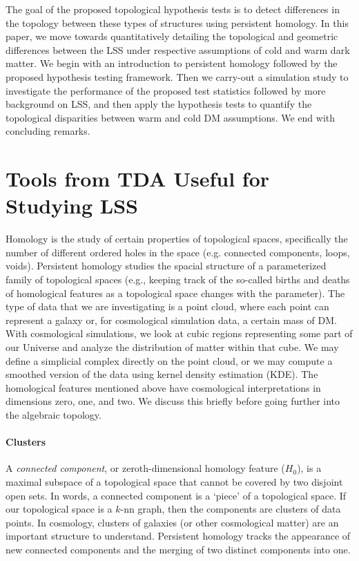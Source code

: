 \documentclass[12pt]{article}
\begin{document}
The goal of the proposed topological hypothesis tests is to detect differences in the topology between these types of structures using persistent homology. In this paper, we move towards quantitatively detailing the topological and geometric differences between the LSS under respective assumptions of cold and warm dark matter. We begin with an introduction to persistent homology followed by the proposed hypothesis testing framework. Then we carry-out a simulation study to investigate the performance of the proposed test statistics followed by more background on LSS, and then apply the hypothesis tests to quantify the topological disparities between warm and cold DM assumptions. We end with concluding remarks.



\section{Tools from TDA Useful for Studying LSS}
\label{sec:tda}
Homology is the study of certain properties of topological spaces, specifically the number of different ordered holes in the space (e.g. connected components, loops, voids). Persistent homology studies the spacial structure of a parameterized family of topological spaces (e.g., keeping track of the so-called
births and deaths of homological features as a topological space changes with the parameter).
%
The type of data that we are investigating is a point cloud, where each point can represent a galaxy or, for cosmological simulation data, a certain mass of DM.
With cosmological simulations,  we look at cubic regions representing some part of our Universe and analyze
the distribution of matter within that cube. We may define a simplicial complex directly on the point cloud, or we may compute a smoothed version of the data using kernel density estimation (KDE). The homological features mentioned above have cosmological interpretations in dimensions zero, one, and two. We discuss this briefly before going further into the algebraic topology.

\paragraph{Clusters} 
A \emph{connected component}, or zeroth-dimensional homology feature ($H_0$), is a maximal subspace of a topological
space that cannot be covered by two disjoint open sets. In words, a connected component is a `piece' of a topological space.  If our topological space is a
$k$-nn graph, then the components are clusters of data points.  In cosmology, clusters of galaxies (or other cosmological matter) are an important
structure to understand. Persistent homology tracks the appearance of new connected components and the merging of two distinct components into one.
\end{document}

